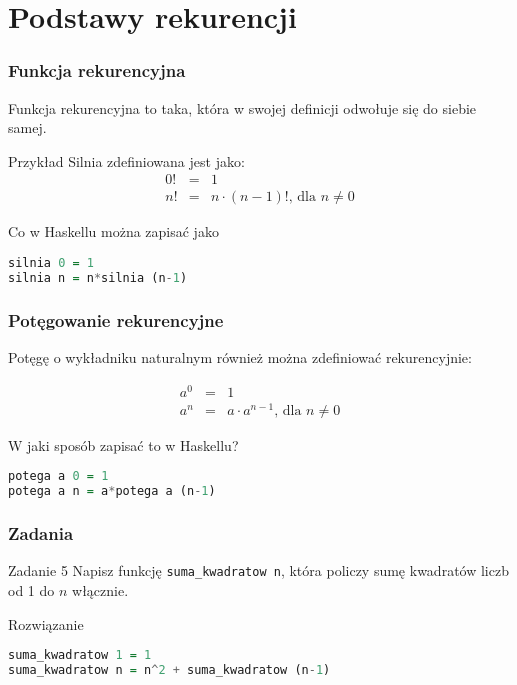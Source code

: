 \section{Podstawy rekurencji}
\sectionframe

\begin{frame}[fragile]
  \frametitle{Funkcja rekurencyjna}
  Funkcja rekurencyjna to taka, która w swojej definicji odwołuje się do
  siebie samej.
  \vspace{1em}
  \pause

  \begin{block}{Przykład}
    Silnia zdefiniowana jest jako:
    \begin{eqnarray}
      \nonumber 0! &=& 1\\
      \nonumber n! &=& n\cdot(n-1)!\text{, dla }n\neq 0
    \end{eqnarray}
  \end{block}
  \pause

  Co w Haskellu można zapisać jako
  \begin{lstlisting}[language=Haskell]
silnia 0 = 1
silnia n = n*silnia (n-1)
  \end{lstlisting}
\end{frame}

\begin{frame}[fragile]
  \frametitle{Potęgowanie rekurencyjne}
  Potęgę o wykładniku naturalnym również można zdefiniować rekurencyjnie:

  \begin{eqnarray}
    \nonumber a^0 &=& 1 \\
    \nonumber a^n &=& a\cdot a^{n-1}\text{, dla }n \neq 0
  \end{eqnarray}
  \pause

  W jaki sposób zapisać to w Haskellu?
  \pause
  \begin{lstlisting}[language=Haskell]
potega a 0 = 1
potega a n = a*potega a (n-1)
  \end{lstlisting}
\end{frame}

\begin{frame}[fragile]
  \frametitle{Zadania}
  \begin{block}{Zadanie 5}
    Napisz funkcję \texttt{suma\_kwadratow n}, która policzy sumę kwadratów
    liczb od 1 do $n$ włącznie.
  \end{block}
  \vspace{1em}
  \pause

  \begin{block}{Rozwiązanie}
    \begin{lstlisting}[language=Haskell]
suma_kwadratow 1 = 1
suma_kwadratow n = n^2 + suma_kwadratow (n-1)
    \end{lstlisting}
  \end{block}
\end{frame}
